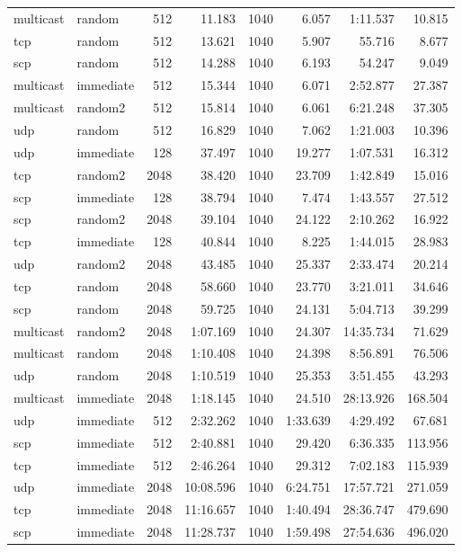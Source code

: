 \begin{tabular}{|l|l|r|r|r|r|r|r|}
multicast & random & 512 & 11.183 & 1040 & 6.057 & 1:11.537 & 10.815\\
tcp & random & 512 & 13.621 & 1040 & 5.907 & 55.716 & 8.677\\
scp & random & 512 & 14.288 & 1040 & 6.193 & 54.247 & 9.049\\
multicast & immediate & 512 & 15.344 & 1040 & 6.071 & 2:52.877 & 27.387\\
multicast & random2 & 512 & 15.814 & 1040 & 6.061 & 6:21.248 & 37.305\\
udp & random & 512 & 16.829 & 1040 & 7.062 & 1:21.003 & 10.396\\
udp & immediate & 128 & 37.497 & 1040 & 19.277 & 1:07.531 & 16.312\\
tcp & random2 & 2048 & 38.420 & 1040 & 23.709 & 1:42.849 & 15.016\\
scp & immediate & 128 & 38.794 & 1040 & 7.474 & 1:43.557 & 27.512\\
scp & random2 & 2048 & 39.104 & 1040 & 24.122 & 2:10.262 & 16.922\\
tcp & immediate & 128 & 40.844 & 1040 & 8.225 & 1:44.015 & 28.983\\
udp & random2 & 2048 & 43.485 & 1040 & 25.337 & 2:33.474 & 20.214\\
tcp & random & 2048 & 58.660 & 1040 & 23.770 & 3:21.011 & 34.646\\
scp & random & 2048 & 59.725 & 1040 & 24.131 & 5:04.713 & 39.299\\
multicast & random2 & 2048 & 1:07.169 & 1040 & 24.307 & 14:35.734 & 71.629\\
multicast & random & 2048 & 1:10.408 & 1040 & 24.398 & 8:56.891 & 76.506\\
udp & random & 2048 & 1:10.519 & 1040 & 25.353 & 3:51.455 & 43.293\\
multicast & immediate & 2048 & 1:18.145 & 1040 & 24.510 & 28:13.926 & 168.504\\
udp & immediate & 512 & 2:32.262 & 1040 & 1:33.639 & 4:29.492 & 67.681\\
scp & immediate & 512 & 2:40.881 & 1040 & 29.420 & 6:36.335 & 113.956\\
tcp & immediate & 512 & 2:46.264 & 1040 & 29.312 & 7:02.183 & 115.939\\
udp & immediate & 2048 & 10:08.596 & 1040 & 6:24.751 & 17:57.721 & 271.059\\
tcp & immediate & 2048 & 11:16.657 & 1040 & 1:40.494 & 28:36.747 & 479.690\\
scp & immediate & 2048 & 11:28.737 & 1040 & 1:59.498 & 27:54.636 & 496.020\\
\hline
\end{tabular}
